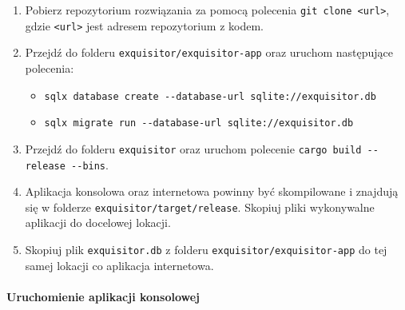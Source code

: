                 \begin{enumerate}
                    \item {
                        Pobierz repozytorium rozwiązania za pomocą polecenia \texttt{git clone <url>}, gdzie \texttt{<url>} jest adresem repozytorium z kodem.
                    }
                    \item {
                        Przejdź do folderu \texttt{exquisitor/exquisitor-app} oraz uruchom następujące polecenia:

                        \begin{itemize}
                            \item {
                                \texttt{sqlx database create -\phantom{}-database-url sqlite://exquisitor.db}
                            }
                            \item {
                                \texttt{sqlx migrate run -\phantom{}-database-url sqlite://exquisitor.db}
                            }
                        \end{itemize}
                    }
                    \item {
                        Przejdź do folderu \texttt{exquisitor} oraz uruchom polecenie \texttt{cargo build -\phantom{}-release -\phantom{}-bins}.
                    }
                    \item {
                        Aplikacja konsolowa oraz internetowa powinny być skompilowane i znajdują się w folderze \texttt{exquisitor/target/release}.
                        Skopiuj pliki wykonywalne aplikacji do docelowej lokacji.
                    }
                    \item{
                        Skopiuj plik \texttt{exquisitor.db} z folderu \texttt{exquisitor/exquisitor-app} do tej samej lokacji co aplikacja internetowa.
                    }
                \end{enumerate}

            \paragraph{Uruchomienie aplikacji konsolowej}

